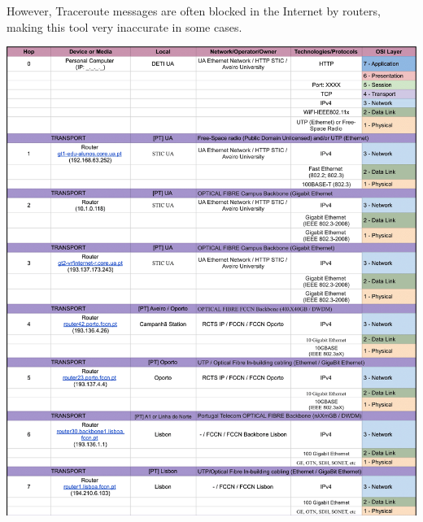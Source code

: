 \documentclass{article}
\begin{document}
However, Traceroute messages are often blocked in the Internet by routers, making this tool very inaccurate in some cases.

\vspace*{\fill}
\begin{center}
    \includegraphics[width=1 \textwidth]{images/traceroute_part1.png}
\end{center}
\vspace*{\fill}\clearpage
\end{document}
